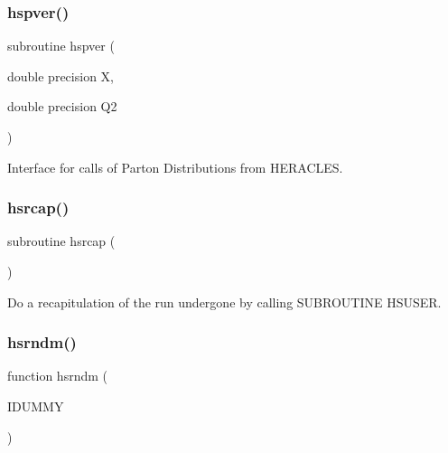 \subsubsection{\texorpdfstring{hspver()}{hspver()}}
{\footnotesize\ttfamily subroutine hspver (\begin{DoxyParamCaption}\item[{double precision}]{X,  }\item[{double precision}]{Q2 }\end{DoxyParamCaption})}



Interface for calls of Parton Distributions from H\+E\+R\+A\+C\+L\+ES. 

\mbox{\label{djangoh__h_8f_abe1abf958c5349e95cfe15f2fa2e3028}} 
\subsubsection{\texorpdfstring{hsrcap()}{hsrcap()}}
{\footnotesize\ttfamily subroutine hsrcap (\begin{DoxyParamCaption}{ }\end{DoxyParamCaption})}



Do a recapitulation of the run undergone by calling S\+U\+B\+R\+O\+U\+T\+I\+NE H\+S\+U\+S\+ER. 

\mbox{\label{djangoh__h_8f_a895b8de31614861bceb4dbcfb33bee8e}} 
\subsubsection{\texorpdfstring{hsrndm()}{hsrndm()}}
{\footnotesize\ttfamily function hsrndm (\begin{DoxyParamCaption}\item[{}]{I\+D\+U\+M\+MY }\end{DoxyParamCaption})}

\mbox{\label{djangoh__h_8f_aee80afbe7295985ce737632fea55347a}} 
